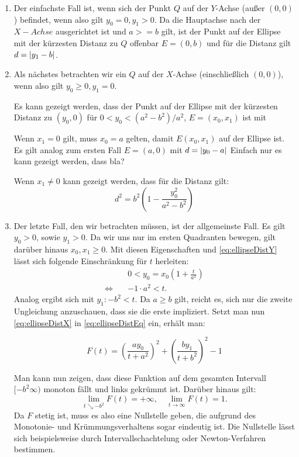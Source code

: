 \begin{enumerate}
	\item Der einfachste Fall ist, wenn sich der Punkt $Q$ auf der $Y$-Achse (außer $(0,0)$) befindet, wenn also gilt $y_0 = 0, y_1 > 0$.
	Da die Hauptachse nach der $X-Achse$ ausgerichtet ist und $a >= b$ gilt, ist der Punkt auf der Ellipse mit der kürzesten Distanz zu $Q$ offenbar $E = (0, b)$ und für die Distanz gilt $d = \lvert y_1 - b\rvert$.
	\item Als nächstes betrachten wir ein $Q$ auf der $X$-Achse (einschließlich $(0,0)$), wenn also gilt  $y_0 \geq 0, y_1 = 0$.
	
	Es kann gezeigt werden, dass der Punkt auf der Ellipse mit der kürzesten Distanz zu $(y_0, 0)$ für $0 < y_0 < (a^2 - b^2)/a^2$, $E = (x_0,x_1)$ ist mit 
	
	Wenn $x_1 = 0$ gilt, muss $x_0 = a$ gelten, damit $E(x_0,x_1)$ auf der Ellipse ist. Es  gilt analog zum ersten Fall $E=(a,0)$ mit $d = \lvert y_0 - a\rvert$ 
	Einfach nur es kann gezeigt werden, dass bla? 
	
	Wenn $x_1 \neq 0$ kann gezeigt werden, dass für die Distanz gilt:
	\[
		d^2 = b^2\left(1 - \frac{y_0^2}{a^2 - b^2}\right)
	\]
	\item Der letzte Fall, den wir betrachten müssen, ist der allgemeinste Fall. Es gilt $y_0 > 0$, sowie $y_1 > 0$. Da wir uns nur im ersten Quadranten bewegen, gilt darüber hinaus $x_0, x_1 \geq 0$. Mit diesen Eigenschaften und \ref{eq:ellipseDistY} lässt sich folgende Einschränkung für $t$ herleiten:
	\begin{equation}
	\begin{aligned}
	& 0 < y_0 = x_0\left(1 + \frac{t}{a^2}\right)\\
	\Leftrightarrow\quad& -1\cdot a^2 < t.
	\end{aligned}
	\end{equation}
	Analog ergibt sich mit $y_1\colon -b^2 < t$. Da $a\geq b$ gilt, reicht es, sich nur die zweite Ungleichung anzuschauen, dass sie die erste impliziert. Setzt man nun \ref{eq:ellipseDistX} in \ref{eq:ellipseDistEq} ein, erhält man:
	
	\begin{equation}
		F(t) = \left(\frac{ay_0}{t+a^2}\right)^2 + \left(\frac{by_1}{t+b^2}\right)^2 - 1
	\end{equation}
	
	Man kann nun zeigen, dass diese Funktion auf dem gesamten Intervall $[-b^2\infty)$ monoton fällt und links gekrümmt ist. Darüber hinaus gilt:
	\[
	\lim\limits_{t \searrow -b^2}{F(t)}	= +\infty, \quad\lim\limits_{t \rightarrow \infty}{F(t)}	= 1.
	\]
	Da $F$ stetig ist, muss es also eine Nullstelle geben, die aufgrund des Monotonie- und Krümmungsverhaltens sogar eindeutig ist. Die Nullstelle lässt sich beispielsweise durch Intervallschachtelung oder Newton-Verfahren bestimmen. 
\end{enumerate}


